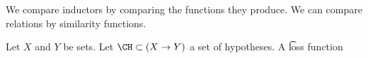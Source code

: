 

We compare inductors by comparing the functions they produce.
We can compare relations by similarity functions.


Let $X$ and $Y$ be sets. Let $\CH \subset (X \to Y)$ a set of hypotheses.
A \t{loss function} 


\blankpage
